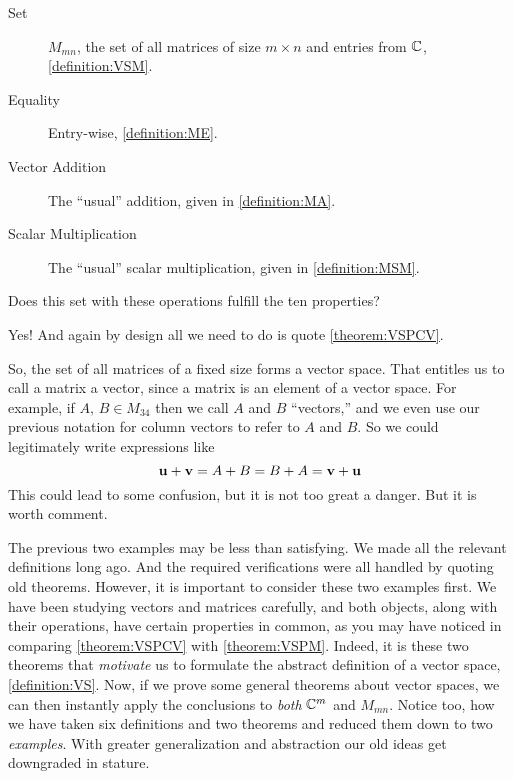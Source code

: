 \documentclass{ximera}
\begin{document}
\begin{example}
  \begin{description}
  \item[Set] $M_{mn}$, the set of all matrices of size $m\times n$ and entries from $\mathbb{C}$, \ref{definition:VSM}.
  \item[Equality] Entry-wise, \ref{definition:ME}.
  \item[Vector Addition]  The ``usual'' addition, given in \ref{definition:MA}.
  \item[Scalar Multiplication] The ``usual'' scalar multiplication, given in \ref{definition:MSM}.
  \end{description}

  Does this set with these operations fulfill the ten properties?  
  \begin{multipleChoice}
  \end{multipleChoice}
  
  \begin{feedback}[correct]
    Yes!  And again by design all we need to do is quote \ref{theorem:VSPCV}.
  \end{feedback}
\end{example}

So, the set of all matrices of a fixed size forms a vector space.
That entitles us to call a matrix a vector, since a matrix is an
element of a vector space.  For example, if $A,\,B\in M_{34}$ then we
call $A$ and $B$ ``vectors,'' and we even use our previous notation
for column vectors to refer to $A$ and $B$.  So we could legitimately
write expressions like
\[
\mathbf{u}+\mathbf{v}=A+B=B+A=\mathbf{v}+\mathbf{u}
\]
This could lead to some confusion, but it is not too great a danger.  But it is worth comment.

The previous two examples may be less than satisfying.  We made all
the relevant definitions long ago.  And the required verifications
were all handled by quoting old theorems.  However, it is important to
consider these two examples first.  We have been studying vectors and
matrices carefully, and both objects, along with their operations,
have certain properties in common, as you may have noticed in
comparing \ref{theorem:VSPCV} with \ref{theorem:VSPM}.  Indeed, it is
these two theorems that \textit{motivate} us to formulate the abstract
definition of a vector space, \ref{definition:VS}.  Now, if we prove
some general theorems about vector spaces, we can then instantly apply
the conclusions to \textit{both} $\mathbb{C}^{m}$ and $M_{mn}$.  Notice
too, how we have taken six definitions and two theorems and reduced
them down to two \textit{examples}.  With greater generalization and
abstraction our old ideas get downgraded in stature.
\end{document}
